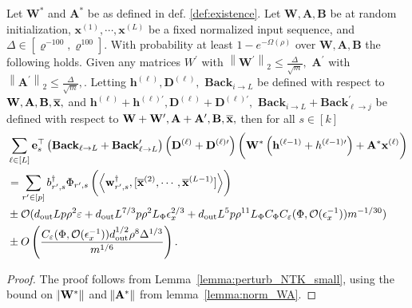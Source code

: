 \begin{lemma}\label{lemma:perturb_small_target}
	Let $\mathbf{W}^{\ast}$ and $\mathbf{A}^{\ast}$ be as defined in def. \ref{def:existence}. Let $\mathbf{W}, \mathbf{A}, \mathbf{B}$ be at random initialization, $\mathbf{x}^{(1)}, \cdots, \mathbf{x}^{(L)}$ be a fixed normalized input sequence, and $\Delta \in\left[\varrho^{-100}, \varrho^{100}\right] .$ With probability at least $1-e^{-\Omega(\rho)}$ over $\mathbf{W}, \mathbf{A}, \mathbf{B}$ the following holds. Given any matrices $W^{\prime}$ with $\left\|\mathbf{W}^{\prime}\right\|_{2} \leq \frac{\Delta}{\sqrt{m}},$ $\mathbf{A}^{\prime}$ with $\left\|\mathbf{A}^{\prime}\right\|_{2} \leq \frac{\Delta}{\sqrt{m}},$. Letting
	$\mathbf{h}^{(\ell)}, \mathbf{D}^{(\ell)},$  $\mathbf{Back}_{i \rightarrow L}$ be defined with respect to $\mathbf{W}, \mathbf{A}, \mathbf{B}, \overline{\mathbf{x}},$ and $\mathbf{h}^{(\ell)} + \mathbf{h}^{(\ell)\prime}, \mathbf{D}^{(\ell)} + \mathbf{D}^{(\ell)\prime},$  $\mathbf{Back}_{i \rightarrow L} + \mathbf{Back}^{\prime}_{\ell \rightarrow j}$ be defined with respect to $\mathbf{W}+\mathbf{W}^{\prime}, \mathbf{A} + \mathbf{A}',  \mathbf{B}, \overline{\mathbf{x}},$
	then for all $s \in [k]$
	\begin{align*}
		& \sum_{\ell \in [L]} \mathbf{e}_s^{\top} \left(\mathbf{Back}_{\ell \rightarrow L}+\mathbf{Back}_{\ell \rightarrow L}^{\prime}\right)\left(\mathbf{D}^{(\ell)}+\mathbf{D}^{(\ell)\prime}\right) \left(\mathbf{W}^{\ast}\left(\mathbf{h}^{(\ell-1)}+h^{(\ell-1)\prime}\right) + \mathbf{A}^{\ast} \mathbf{x}^{(\ell)} \right) \\& 
		= \sum_{r' \in [p]}  b_{r', s}^{\dagger} \Phi_{r', s} \left(\left\langle \mathbf{w}_{r', s}^{\dagger}, [\overline{\mathbf{x}}^{(2)}, \cdots, \overline{\mathbf{x}}^{(L-1)}]\right\rangle\right)  \\& \pm \mathcal{O}(d_{\mathrm{out}} Lp\rho^2 \varepsilon + d_{\mathrm{out}} L^{7/3} p \rho^2 L_{\Phi} \epsilon_x^{2/3} + d_{\mathrm{out}}  L^5 p \rho^{11} L_{\Phi} C_{\Phi}  C_{\varepsilon}(\Phi, \mathcal{O}(\epsilon_x^{-1}))  m^{-1/30} ) \\& \pm  O\left(\frac{ C_{\varepsilon}(\Phi, \mathcal{O}(\epsilon_x^{-1})) d_{\mathrm{out}} ^{1/2} \rho^{8} \Delta^{1 / 3}}{m^{1 / 6}}\right).
	\end{align*}
\end{lemma}

\begin{proof}
	The proof follows from Lemma~\ref{lemma:perturb_NTK_small}, using the bound on $\norm{\mathbf{W}^{\ast}}$ and $\norm{\mathbf{A}^{\ast}}$ from lemma~\ref{lemma:norm_WA}.
\end{proof}



